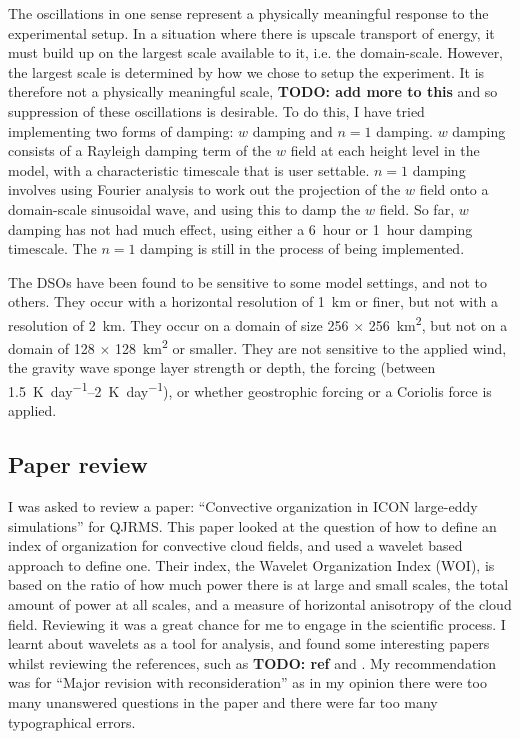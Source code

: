 \documentclass[11pt,a4paper]{article}
\newcommand\todo[1]{\textbf{TODO: #1}}
\newcommand\dom[1]{\si{#1} $\times$ \SI{#1}{km^2}}
\begin{document}
The oscillations in one sense represent a physically meaningful response to the experimental setup. In a situation where there is upscale transport of energy, it must build up on the largest scale available to it, i.e. the domain-scale. However, the largest scale is determined by how we chose to setup the experiment. It is therefore not a physically meaningful scale, \todo{add more to this} and so suppression of these oscillations is desirable. To do this, I have tried implementing two forms of damping: $w$ damping and $n = 1$ damping. $w$ damping consists of a Rayleigh damping term of the $w$ field at each height level in the model, with a characteristic timescale that is user settable. $n = 1$ damping involves using Fourier analysis to work out the projection of the $w$ field onto a domain-scale sinusoidal wave, and using this to damp the $w$ field. So far, $w$ damping has not had much effect, using either a \SI{6}{hour} or \SI{1}{hour} damping timescale. The $n = 1$ damping is still in the process of being implemented.

The DSOs have been found to be sensitive to some model settings, and not to others. They occur with a horizontal resolution of \SI{1}{km} or finer, but not with a resolution of \SI{2}{km}. They occur on a domain of size \dom{256}, but not on a domain of \dom{128} or smaller. They are not sensitive to the applied wind, the gravity wave sponge layer strength or depth, the forcing (between \SIrange{1.5}{2}{K.day^{-1}}), or whether geostrophic forcing or a Coriolis force is applied.

\subsection{Paper review}
I was asked to review a paper: ``Convective organization in ICON large-eddy simulations'' for QJRMS. This paper looked at the question of how to define an index of organization for convective cloud fields, and used a wavelet based approach to define one. Their index, the Wavelet Organization Index (WOI), is based on the ratio of how much power there is at large and small scales, the total amount of power at all scales, and a measure of horizontal anisotropy of the cloud field. Reviewing it was a great chance for me to engage in the scientific process. I learnt about wavelets as a tool for analysis, and found some interesting papers whilst reviewing the references, such as \todo{ref} \cite{weniger2017} and \cite{wong2016}. %
My recommendation was for ``Major revision with reconsideration'' as in my opinion there were too many unanswered questions in the paper and there were far too many typographical errors.
\end{document}
